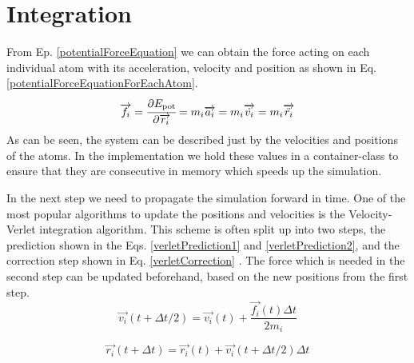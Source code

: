 \section{Integration}
\begin{comment}
- obtain force from the previous equation
- dirivation in v. r.. from the mass
- system can be discribed just by the velocity and postion of each atom
- in the simulation the positions and velocities of the individual atoms have to be tracked and updated accordingly
- most used  is the Velocity-Verlet Algorithm
\end{comment}
From Ep. \ref{potentialForceEquation} we can obtain the force acting on each individual atom with its acceleration, velocity and position as shown in  Eq. \ref{potentialForceEquationForEachAtom}. 
\begin{equation}
	\label{potentialForceEquationForEachAtom}
	\overrightarrow{f_{i}} = \cfrac{\displaystyle\partial E_{\mathrm{pot}}}{\displaystyle \partial \overrightarrow{r_{i}}} = m_{i}\overrightarrow{a_{i}} = m_{i}\overrightarrow{\dot{v_{i}}} = m_{i}\overrightarrow{\ddot{r_{i}}}
\end{equation}
As can be seen, the system can be described just by the velocities and positions of the atoms. 
In the implementation we hold these values in a container-class to ensure that they are consecutive in  memory which speeds up the simulation. 
\par
In the next step we need to propagate the simulation forward in time. One of the most popular algorithms to update the positions and velocities is the Velocity-Verlet integration algorithm.
This scheme is often split up into two steps, the prediction shown in the Eqs.  \ref{verletPrediction1} and \ref{verletPrediction2}, and the correction step shown in Eq. \ref{verletCorrection} \cite[cf. ][]{molDymCourse}. The force which is needed in the second step can be updated beforehand, based on the new positions from the first step.
\begin{equation}
	\label{verletPrediction1}
	\overrightarrow{v_{i}}(t+\Delta t/2) = 
	\overrightarrow{v_{i}}(t) + 
	\frac{\overrightarrow{f_{i}}(t)\Delta t}{2m_{i}}
\end{equation}

\begin{equation}
	\label{verletPrediction2}
	\overrightarrow{r_{i}}(t+\Delta t) = 
	\overrightarrow{r_{i}}(t) + \overrightarrow{v_{i}}(t + \Delta t/2)\Delta t
\end{equation}

